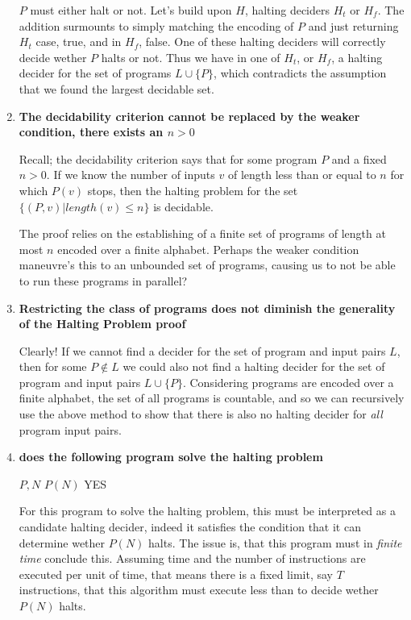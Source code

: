 \documentclass{article}
\newenvironment{answered}{\par\normalfont}{}
\begin{document}
\begin{enumerate}
\begin{answered}
	$P$ must either halt or not. Let's build upon $H$, halting deciders $H_t$ or $H_f$. The addition surmounts to simply matching the encoding of $P$ and just returning $H_t$ case, true, and in $H_f$, false. One of these halting deciders will correctly decide wether $P$ halts or not. Thus we have in one of $H_t$, or $H_f$, a halting decider for the set of programs $L \cup \{P\}$, which contradicts the assumption that we found the largest decidable set.
	\end{answered}

\item{\textbf{The decidability criterion cannot be replaced by the weaker condition, there exists an $n > 0$}}

	\begin{answered}
		Recall; the decidability criterion says that for some program $P$ and a fixed $n > 0$. If we know the number of inputs $v$ of length less than or equal to $n$ for which $P(v)$ stops, then the halting problem for the set $\{(P,v) | length(v) \leq n \}$ is decidable.

		The proof relies on the establishing of a finite set of programs of length at most $n$ encoded over a finite alphabet. Perhaps the weaker condition maneuvre's this to an unbounded set of programs, causing us to not be able to run these programs in parallel?
	\end{answered}

\item{\textbf{Restricting the class of programs does not diminish the generality of the Halting Problem proof}}

	\begin{answered}
		Clearly! If we cannot find a decider for the set of program and input pairs $L$, then for some $P \not\in L$ we could also not find a halting decider for the set of program and input pairs $L \cup \{P\}$. Considering programs are encoded over a finite alphabet, the set of all programs is countable, and so we can recursively use the above method to show that there is also no halting decider for \emph{all} program input pairs.
	\end{answered}

\item{\textbf{does the following program solve the halting problem}}
	\begin{answered}
		\begin{algorithmic}[1]
	\REQUIRE $P, N$
	\STATE $P(N)$
	\RETURN YES
\end{algorithmic}
For this program to solve the halting problem, this must be interpreted as a candidate halting decider, indeed it satisfies the condition that it can determine wether $P(N)$ halts. The issue is, that this program must in \emph{finite time} conclude this. Assuming time and the number of instructions are executed per unit of time, that means there is a fixed limit, say $T$ instructions, that this algorithm must execute less than to decide wether $P(N)$ halts.


\end{answered}
\end{enumerate}
\end{document}
